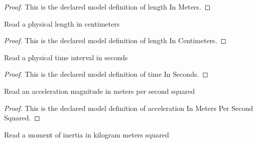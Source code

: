\begin{proof}
  This is the declared model definition of length In Meters.
\end{proof}
\begin{definition}
  \label{def:physics:phyx-mini-0276:phyxminiproblems-problemphyxmini0276-lengthincentimeters}
  Read a physical length in centimeters
\end{definition}
\begin{proof}
  This is the declared model definition of length In Centimeters.
\end{proof}
\begin{definition}
  \label{def:physics:phyx-mini-0276:phyxminiproblems-problemphyxmini0276-timeinseconds}
  Read a physical time interval in seconds
\end{definition}
\begin{proof}
  This is the declared model definition of time In Seconds.
\end{proof}
\begin{definition}
  \label{def:physics:phyx-mini-0276:phyxminiproblems-problemphyxmini0276-accelerationinmeterspersecondsquared}
  Read an acceleration magnitude in meters per second squared
\end{definition}
\begin{proof}
  This is the declared model definition of acceleration In Meters Per Second Squared.
\end{proof}
\begin{definition}
  \label{def:physics:phyx-mini-0276:phyxminiproblems-problemphyxmini0276-momentofinertiainkilogrammeterssquared}
  Read a moment of inertia in kilogram meters squared
\end{definition}
